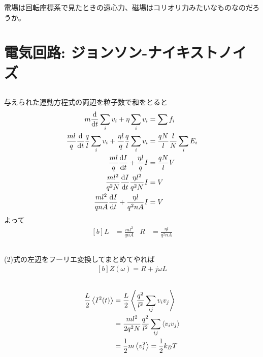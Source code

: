 \documentclass[../../master.tex]{subfiles}
\begin{document}
電場は回転座標系で見たときの遠心力、磁場はコリオリ力みたいなものなのだろうか。

\clearpage
\section{電気回路: ジョンソン-ナイキストノイズ}
\subsection{}
与えられた運動方程式の両辺を粒子数で和をとると
\begin{equation}\begin{aligned}[b]
    m\dv{t}\sum_iv_i + \eta \sum_i v_i &= \sum f_i\\
    \frac{ml}{q} \dv{t}\frac{q}{l} \sum_i v_i + \frac{\eta l}{q}\frac{q}{l}\sum_i v_i &= \frac{qN}{l}\frac{l}{N}\sum_i E_i\\
    \frac{ml}{q} \dv{I}{t} + \frac{\eta l}{q}I &= \frac{qN}{l}V\\
    \frac{ml^2}{q^2N}\dv{I}{t} \frac{\eta l^2}{q^2N}I &= V\\
    \frac{ml^2}{qnA} \dv{I}{t} + \frac{\eta l}{q^2 nA} I &=V
\end{aligned}\end{equation}
よって
\begin{equation}\begin{aligned}[b]
    L &= \frac{ml^2}{qnA} &  R &= \frac{\eta l}{q^2 nA}
\end{aligned}\end{equation}

\subsection{}
(2)式の左辺をフーリエ変換してまとめてやれば
\begin{equation}\begin{aligned}[b]
    Z(\omega) = R + j\omega L
\end{aligned}\end{equation}

\subsection{}
\begin{equation}\begin{aligned}[b]
    \frac{L}{2}\ev{I^2(t)} &= \frac{L}{2} \ev{\frac{q^2}{l^2}\sum_{ij}v_iv_j}\\
    &= \frac{ml^2}{2q^2N}\frac{q^2}{l^2}\sum_{ij}\ev{v_iv_j}\\
    &= \frac{1}{2}m\ev{v_i^2} = \frac{1}{2}k_B T
\end{aligned}\end{equation}
\end{document}
